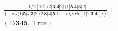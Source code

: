 \documentclass[varwidth, border=5pt]{standalone}
\begin{document}
\begin{my}
$\begin{gathered}
\scriptscriptstyle\frac{-1/2[12]⟨2|𝟑|𝟒|2⟩⟨1|𝟓|𝟒|𝟑|2]}{(-s_{12}⟨1|𝟓|𝟒|𝟑|2]⟨2|𝟑|𝟒|𝟓|1]+m_t²tr5(1|2|𝟑|𝟒)²)} +\\
\scriptscriptstyle(12𝟑𝟒𝟓,\;\text{True}) \phantom{+}
\end{gathered}$
\end{my}
\end{document}
